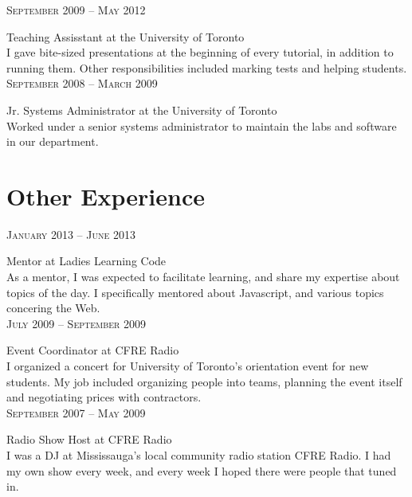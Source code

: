 \documentclass[10pt]{article}
\begin{document}
\begin{minipage}[t]{0.5\textwidth}
    \raggedleft
    \textsc{\normalsize September 2009 -- May 2012}\par

    \raggedright\large Teaching Assisstant at the University of Toronto\\

    \normalsize{I gave bite-sized presentations at the beginning of every 
    tutorial, in addition to running them. Other responsibilities included
    marking tests and helping students.}\\[10pt]

    \raggedleft
    \textsc{\normalsize September 2008 -- March 2009}\par

    \raggedright\large Jr. Systems Administrator at the University of Toronto\\

    \normalsize{Worked under a senior systems administrator to maintain the
    labs and software in our department.}\\[10pt]

\section{Other Experience}
    \raggedleft
    \textsc{\normalsize January 2013 -- June 2013}\par

    \raggedright\large Mentor at Ladies Learning Code\\

    \normalsize{As a mentor, I was expected to facilitate learning, and share my
    expertise about topics of the day. I specifically mentored about Javascript,
    and various topics concering the Web.}\\[10pt]

    \raggedleft
    \textsc{\normalsize July 2009 -- September 2009}\par

    \raggedright\large Event Coordinator at CFRE Radio\\

    \normalsize{I organized a concert for University of Toronto's orientation
    event for new students. My job included organizing people into teams, 
    planning the event itself and negotiating prices with contractors.}\\[10pt]

    \raggedleft
    \textsc{\normalsize September 2007 -- May 2009}\par

    \raggedright\large Radio Show Host at CFRE Radio\\

    \normalsize{I was a DJ at Mississauga's local community radio station
    CFRE Radio. I had my own show every week, and every week I hoped there
    were people that tuned in.}\\[10pt]

\end{minipage}
\end{document}
